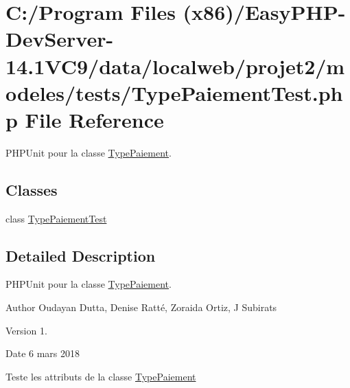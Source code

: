 \hypertarget{_type_paiement_test_8php}{}\section{C\+:/\+Program Files (x86)/\+Easy\+P\+H\+P-\/\+Dev\+Server-\/14.1\+V\+C9/data/localweb/projet2/modeles/tests/\+Type\+Paiement\+Test.php File Reference}
\label{_type_paiement_test_8php}


P\+H\+P\+Unit pour la classe \hyperlink{class_type_paiement}{Type\+Paiement}.  


\subsection*{Classes}
\begin{DoxyCompactItemize}
\item 
class \hyperlink{class_type_paiement_test}{Type\+Paiement\+Test}
\end{DoxyCompactItemize}


\subsection{Detailed Description}
P\+H\+P\+Unit pour la classe \hyperlink{class_type_paiement}{Type\+Paiement}. 

\begin{DoxyAuthor}{Author}
Oudayan Dutta, Denise Ratté, Zoraida Ortiz, J Subirats 
\end{DoxyAuthor}
\begin{DoxyVersion}{Version}
1. 
\end{DoxyVersion}
\begin{DoxyDate}{Date}
6 mars 2018
\end{DoxyDate}
Teste les attributs de la classe \hyperlink{class_type_paiement}{Type\+Paiement} 